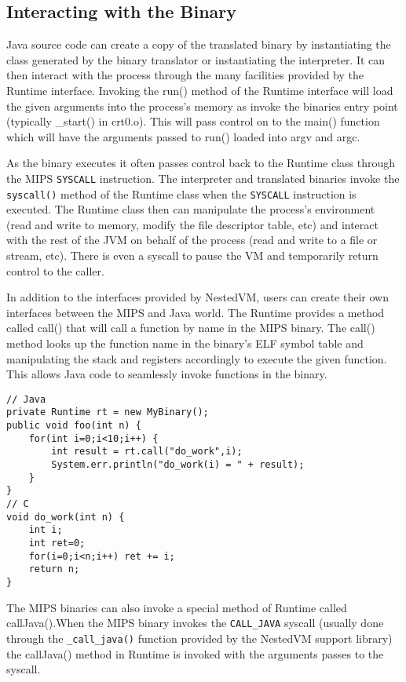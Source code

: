 \documentclass{acmconf}
\begin{document}
\subsection{Interacting with the Binary}

Java source code can create a copy of the translated binary by instantiating
the class generated by the binary translator or instantiating the
interpreter. It can then interact with the process through the many
facilities provided by the Runtime interface.  Invoking the run() method of
the Runtime interface will load the given arguments into the process's
memory as invoke the binaries entry point (typically \_start() in crt0.o).
This will pass control on to the main() function which will have the
arguments passed to run() loaded into argv and argc.

As the binary executes it often passes control back to the Runtime class
through the MIPS {\tt SYSCALL} instruction. The interpreter and translated
binaries invoke the {\tt syscall()} method of the Runtime class when the
{\tt SYSCALL} instruction is executed. The Runtime class then can manipulate
the process's environment (read and write to memory, modify the file
descriptor table, etc) and interact with the rest of the JVM on behalf of
the process (read and write to a file or stream, etc). There is even a
syscall to pause the VM and temporarily return control to the caller.

In addition to the interfaces provided by NestedVM, users can create their
own interfaces between the MIPS and Java world. The Runtime provides a
method called call() that will call a function by name in the MIPS binary.
The call() method looks up the function name in the binary's ELF symbol
table and manipulating the stack and registers accordingly to execute the
given function. This allows Java code to seamlessly invoke functions in the
binary.

{\footnotesize\begin{verbatim}
// Java
private Runtime rt = new MyBinary();
public void foo(int n) {
    for(int i=0;i<10;i++) {
        int result = rt.call("do_work",i);
        System.err.println("do_work(i) = " + result);
    }
}
// C
void do_work(int n) {
    int i;
    int ret=0;
    for(i=0;i<n;i++) ret += i;
    return n;
}
\end{verbatim}}

The MIPS binaries can also invoke a special method of Runtime called
callJava().When the MIPS binary invokes the {\tt CALL\_JAVA} syscall
(usually done through the {\tt \_call\_java()} function provided by the
NestedVM support library) the callJava() method in Runtime is invoked with
the arguments passes to the syscall.
\end{document}
